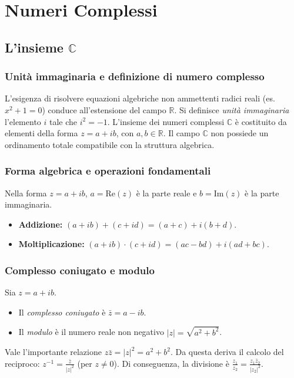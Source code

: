 \section{Numeri Complessi}
\subsection{L'insieme $\mathbb{C}$}
\subsubsection{Unità immaginaria e definizione di numero complesso}
L'esigenza di risolvere equazioni algebriche non ammettenti radici reali (es. $x^2+1=0$) conduce all'estensione del campo $\mathbb{R}$. Si definisce \textit{unità immaginaria} l'elemento $i$ tale che $i^2 = -1$.
L'insieme dei numeri complessi $\mathbb{C}$ è costituito da elementi della forma $z = a + ib$, con $a, b \in \mathbb{R}$. Il campo $\mathbb{C}$ non possiede un ordinamento totale compatibile con la struttura algebrica.

\subsubsection{Forma algebrica e operazioni fondamentali}
Nella forma $z = a + ib$, $a = \text{Re}(z)$ è la parte reale e $b = \text{Im}(z)$ è la parte immaginaria.
\begin{itemize}
    \item \textbf{Addizione:} $(a+ib) + (c+id) = (a+c) + i(b+d)$.
    \item \textbf{Moltiplicazione:} $(a+ib) \cdot (c+id) = (ac-bd) + i(ad+bc)$.
\end{itemize}

\subsubsection{Complesso coniugato e modulo}
Sia $z = a + ib$.
\begin{itemize}
    \item Il \textit{complesso coniugato} è $\bar{z} = a - ib$.
    \item Il \textit{modulo} è il numero reale non negativo $|z| = \sqrt{a^2 + b^2}$.
\end{itemize}
Vale l'importante relazione $z \bar{z} = |z|^2 = a^2+b^2$. Da questa deriva il calcolo del reciproco: $z^{-1} = \frac{\bar{z}}{|z|^2}$ (per $z \neq 0$). Di conseguenza, la divisione è $\frac{z_1}{z_2} = \frac{z_1 \bar{z}_2}{|z_2|^2}$.

